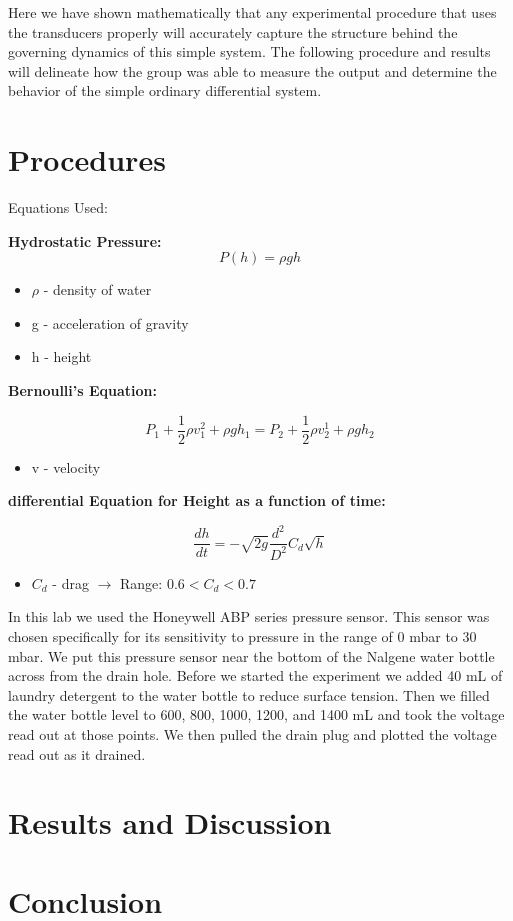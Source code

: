 \documentclass{article}
\theoremstyle{definition}
\theoremstyle{remark}
\begin{document}
	
	Here we have shown mathematically that any experimental procedure that uses the transducers properly will accurately capture the structure behind the governing dynamics of this simple system.  The following procedure and results will delineate how the group was able to measure the output and determine the behavior of the simple ordinary differential system.
	
	
	\section{Procedures}
	
	
	
	
	
	Equations Used:
	
	\textbf{Hydrostatic Pressure:}
	\[
	P(h) = \rho g h 
	\]
	\begin{itemize}
		\item \(\rho\) - density of water
		\item g - acceleration of gravity
		\item h - height 
	\end{itemize}
	
	\textbf{Bernoulli's Equation:}
	
	\[
	P_1 + \frac{1}{2}\rho v_1^2 + \rho g h_1 = P_2 + \frac{1}{2}\rho v_2^1 + \rho g h_2
	\]
	\begin{itemize}
		\item v - velocity 
	\end{itemize}
	
	\textbf{differential Equation for Height as a function of time:}
	
	\[\frac{dh}{dt} = -\sqrt{2g} \frac{d^2}{D^2} C_d \sqrt{h}\]
	\begin{itemize}
		\item \(C_d\) - drag $\rightarrow$ Range: \(0.6 < C_d < 0.7\)
	\end{itemize}
	
	
	In this lab we used the Honeywell ABP series pressure sensor. This sensor was chosen specifically for its sensitivity to pressure in the range of 0 mbar to 30 mbar. We put this pressure sensor near the bottom of the Nalgene water bottle across from the drain hole. Before we started the experiment we added 40 mL of laundry detergent to the water bottle to reduce surface tension. Then we filled the water bottle level to 600, 800, 1000, 1200, and 1400 mL and took the voltage read out at those points. We then pulled the drain plug and plotted the voltage read out as it drained. 
	
	\section{Results and Discussion}
	\section{Conclusion}
	
	
	
	
	
	
\end{document}

